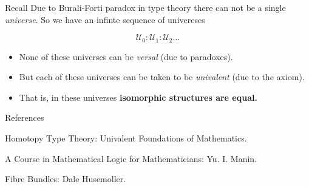 \documentclass[10pt]{beamer}
\newcommand{\U}{\mathscr{U}}
\theoremstyle{definition}
\theoremstyle{definition}
\begin{document}
\begin{frame}

\begin{block}{Recall}
Due to Burali-Forti paradox in type theory there can not be a single \emph{universe}. So
we have an infinte sequence of univereses 

\[ \U_0 : \U_1 : \U_2 ...\]
\end{block}

\begin{block}{}
\begin{itemize}
\item None of these universes can be \emph{versal} (due to paradoxes).
\item But each of these universes can be taken to be \emph{univalent} (due to the axiom).
\item That is, in these universes \textbf{isomorphic structures are equal.}
\end{itemize}
\end{block}




\end{frame}


\begin{frame}{References}

\begin{thebibliography}{99}

Homotopy Type Theory: Univalent Foundations of Mathematics.

A Course in Mathematical Logic for Mathematicians: Yu. I. Manin. 

Fibre Bundles: Dale Husemoller.


\end{thebibliography}
\end{frame}
\end{document}

